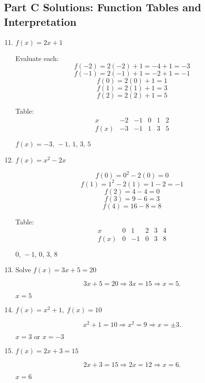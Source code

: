\documentclass[12pt]{article}
\begin{document}
\subsection*{Part C Solutions: Function Tables and Interpretation}
\begin{enumerate}
  \setcounter{enumi}{10}
  \item \(f(x) = 2x + 1\)

  Evaluate each:
  \[
  f(-2)=2(-2)+1=-4+1=-3
  \]
  \[
  f(-1)=2(-1)+1=-2+1=-1
  \]
  \[
  f(0)=2(0)+1=1
  \]
  \[
  f(1)=2(1)+1=3
  \]
  \[
  f(2)=2(2)+1=5
  \]

  Table:
  \[
  \begin{array}{c|ccccc}
  x & -2 & -1 & 0 & 1 & 2 \\ \hline
  f(x) & -3 & -1 & 1 & 3 & 5
  \end{array}
  \]

  \(\boxed{f(x) = -3,\,-1,\,1,\,3,\,5}\)

  \item \(f(x) = x^2 - 2x\)

  \[
  f(0)=0^2-2(0)=0
  \]
  \[
  f(1)=1^2-2(1)=1-2=-1
  \]
  \[
  f(2)=4-4=0
  \]
  \[
  f(3)=9-6=3
  \]
  \[
  f(4)=16-8=8
  \]

  Table:
  \[
  \begin{array}{c|ccccc}
  x & 0 & 1 & 2 & 3 & 4 \\ \hline
  f(x) & 0 & -1 & 0 & 3 & 8
  \end{array}
  \]

  \(\boxed{0,\,-1,\,0,\,3,\,8}\)

  \item Solve \(f(x) = 3x + 5 = 20\)

  \[
  3x + 5 = 20 \Rightarrow 3x = 15 \Rightarrow x = 5.
  \]

  \(\boxed{x = 5}\)

  \item \(f(x) = x^2 + 1,\; f(x) = 10\)

  \[
  x^2 + 1 = 10 \Rightarrow x^2 = 9 \Rightarrow x = \pm 3.
  \]

  \(\boxed{x = 3 \text{ or } x = -3}\)

  \item \(f(x) = 2x + 3 = 15\)

  \[
  2x + 3 = 15 \Rightarrow 2x = 12 \Rightarrow x = 6.
  \]

  \(\boxed{x = 6}\)
\end{enumerate}
\end{document}
